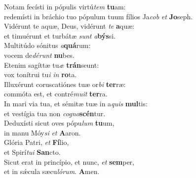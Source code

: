 \evenverse Notam fecísti in pópulis virtú\textit{tem} \textbf{tu}am:~\*\\
\evenverse redemísti in bráchio tuo pópulum tuum fílios Ja\textit{cob} \textit{et} \textbf{Jo}seph.\\
\oddverse Vidérunt te aquæ, Deus, vidérunt \textit{te} \textbf{a}quæ:~\*\\
\oddverse et timuérunt et turbátæ \textit{sunt} \textit{a}\textbf{býs}si.\\
\evenverse Multitúdo sónitus \textit{a}\textbf{quá}rum:~\*\\
\evenverse vocem de\textit{dé}\textit{runt} \textbf{nu}bes.\\
\oddverse Etenim sagíttæ tu\textit{æ} \textbf{trán}seunt:~\*\\
\oddverse vox tonítrui tu\textit{i} \textit{in} \textbf{ro}ta.\\
\evenverse Illuxérunt coruscatiónes tuæ or\textit{bi} \textbf{ter}ræ:~\*\\
\evenverse commóta est, et contré\textit{mu}\textit{it} \textbf{ter}ra.\\
\oddverse In mari via tua, et sémitæ tuæ in a\textit{quis} \textbf{mul}tis:~\*\\
\oddverse et vestígia tua non \textit{co}\textit{gno}\textbf{scén}tur.\\
\evenverse Deduxísti sicut oves pópu\textit{lum} \textbf{tu}um,~\*\\
\evenverse in manu Móy\textit{si} \textit{et} \textbf{A}aron.\\
\oddverse Glória Patri, \textit{et} \textbf{Fí}lio,~\*\\
\oddverse et Spirí\textit{tu}\textit{i} \textbf{San}cto.\\
\evenverse Sicut erat in princípio, et nunc, \textit{et} \textbf{sem}per,~\*\\
\evenverse et in sǽcula sæcu\textit{ló}\textit{rum}. \textbf{A}men.\\
